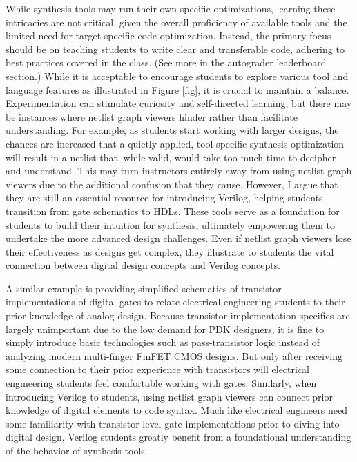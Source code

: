 While synthesis tools may run their own specific optimizations, learning these intricacies are not critical, given the overall proficiency of available tools and the limited need for target-specific code optimization. Instead, the primary focus should be on teaching students to write clear and transferable code, adhering to best practices covered in the class. (See more in the autograder leaderboard section.) While it is acceptable to encourage students to explore various tool and language features as illustrated in Figure [fig], it is crucial to maintain a balance. Experimentation can stimulate curiosity and self-directed learning, but there may be instances where netlist graph viewers hinder rather than facilitate understanding. For example, as students start working with larger designs, the chances are increased that a quietly-applied, tool-specific synthesis optimization will result in a netlist that, while valid, would take too much time to decipher and understand. This may turn instructors entirely away from using netlist graph viewers due to the additional confusion that they cause. However, I argue that they are still an essential resource for introducing Verilog, helping students transition from gate schematics to HDLs. These tools serve as a foundation for students to build their intuition for synthesis, ultimately empowering them to undertake the more advanced design challenges. Even if netlist graph viewers lose their effectiveness as designs get complex, they illustrate to students the vital connection between digital design concepts and Verilog concepts.

A similar example is providing simplified schematics of transistor implementations of digital gates to relate electrical engineering students to their prior knowledge of analog design. Because transistor implementation specifics are largely unimportant due to the low demand for PDK designers, it is fine to simply introduce basic technologies such as pass-transistor logic instead of analyzing modern multi-finger FinFET CMOS designs. But only after receiving some connection to their prior experience with transistors will electrical engineering students feel comfortable working with gates. Similarly, when introducing Verilog to students, using netlist graph viewers can connect prior knowledge of digital elements to code syntax. Much like electrical engineers need some familiarity with transistor-level gate implementations prior to diving into digital design, Verilog students greatly benefit from a foundational understanding of the behavior of synthesis tools.

